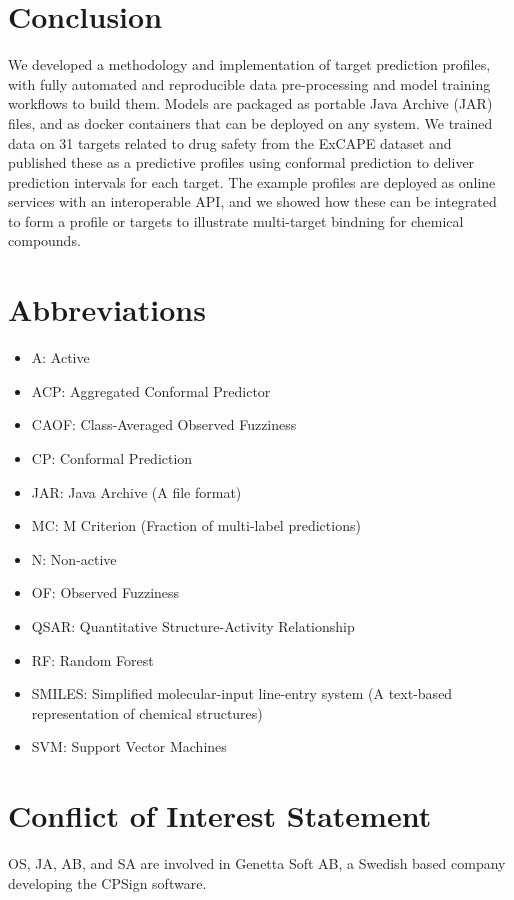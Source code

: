 \documentclass[utf8]{frontiersSCNS} %
\begin{document}
\FloatBarrier
\section*{Conclusion}
We developed a methodology and implementation of target prediction profiles,
with fully automated and reproducible data pre-processing and model training
workflows to build them. Models are packaged as portable Java Archive (JAR)
files, and as docker containers that can be deployed on any system. We trained
data on 31 targets related to drug safety from the ExCAPE dataset and published
these as a predictive profiles using conformal prediction to deliver prediction
intervals for each target. The example profiles are deployed as online services
with an interoperable API, and we showed how these can be integrated to form a
profile or targets to illustrate multi-target bindning for chemical compounds.





\section*{Abbreviations}

\begin{itemize}
    \item A: Active
    \item ACP: Aggregated Conformal Predictor
    \item CAOF: Class-Averaged Observed Fuzziness
    \item CP: Conformal Prediction
    \item JAR: Java Archive (A file format)
    \item MC: M Criterion (Fraction of multi-label predictions)
    \item N: Non-active
    \item OF: Observed Fuzziness
    \item QSAR: Quantitative Structure-Activity Relationship
    \item RF: Random Forest
    \item SMILES: Simplified molecular-input line-entry system (A text-based representation of chemical structures)
    \item SVM: Support Vector Machines
\end{itemize}

\section*{Conflict of Interest Statement}
OS, JA, AB, and SA are involved in Genetta Soft AB, a Swedish based company
developing the CPSign software.
\end{document}

